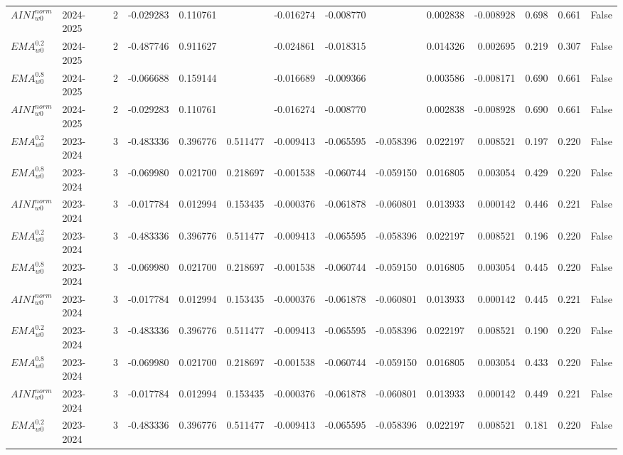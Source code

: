 \begin{tabular}{@{}llrrrrrrrrrlll@{}}
$AINI^{norm}_{w0}$ & 2024-2025 & 2 & -0.029283 & 0.110761 &  & -0.016274 & -0.008770 &  & 0.002838 & -0.008928 & 0.698 & 0.661 & False \\
$EMA^{0.2}_{w0}$ & 2024-2025 & 2 & -0.487746 & 0.911627 &  & -0.024861 & -0.018315 &  & 0.014326 & 0.002695 & 0.219 & 0.307 & False \\
$EMA^{0.8}_{w0}$ & 2024-2025 & 2 & -0.066688 & 0.159144 &  & -0.016689 & -0.009366 &  & 0.003586 & -0.008171 & 0.690 & 0.661 & False \\
$AINI^{norm}_{w0}$ & 2024-2025 & 2 & -0.029283 & 0.110761 &  & -0.016274 & -0.008770 &  & 0.002838 & -0.008928 & 0.690 & 0.661 & False \\
$EMA^{0.2}_{w0}$ & 2023-2024 & 3 & -0.483336 & 0.396776 & 0.511477 & -0.009413 & -0.065595 & -0.058396 & 0.022197 & 0.008521 & 0.197 & 0.220 & False \\
$EMA^{0.8}_{w0}$ & 2023-2024 & 3 & -0.069980 & 0.021700 & 0.218697 & -0.001538 & -0.060744 & -0.059150 & 0.016805 & 0.003054 & 0.429 & 0.220 & False \\
$AINI^{norm}_{w0}$ & 2023-2024 & 3 & -0.017784 & 0.012994 & 0.153435 & -0.000376 & -0.061878 & -0.060801 & 0.013933 & 0.000142 & 0.446 & 0.221 & False \\
$EMA^{0.2}_{w0}$ & 2023-2024 & 3 & -0.483336 & 0.396776 & 0.511477 & -0.009413 & -0.065595 & -0.058396 & 0.022197 & 0.008521 & 0.196 & 0.220 & False \\
$EMA^{0.8}_{w0}$ & 2023-2024 & 3 & -0.069980 & 0.021700 & 0.218697 & -0.001538 & -0.060744 & -0.059150 & 0.016805 & 0.003054 & 0.445 & 0.220 & False \\
$AINI^{norm}_{w0}$ & 2023-2024 & 3 & -0.017784 & 0.012994 & 0.153435 & -0.000376 & -0.061878 & -0.060801 & 0.013933 & 0.000142 & 0.445 & 0.221 & False \\
$EMA^{0.2}_{w0}$ & 2023-2024 & 3 & -0.483336 & 0.396776 & 0.511477 & -0.009413 & -0.065595 & -0.058396 & 0.022197 & 0.008521 & 0.190 & 0.220 & False \\
$EMA^{0.8}_{w0}$ & 2023-2024 & 3 & -0.069980 & 0.021700 & 0.218697 & -0.001538 & -0.060744 & -0.059150 & 0.016805 & 0.003054 & 0.433 & 0.220 & False \\
$AINI^{norm}_{w0}$ & 2023-2024 & 3 & -0.017784 & 0.012994 & 0.153435 & -0.000376 & -0.061878 & -0.060801 & 0.013933 & 0.000142 & 0.449 & 0.221 & False \\
$EMA^{0.2}_{w0}$ & 2023-2024 & 3 & -0.483336 & 0.396776 & 0.511477 & -0.009413 & -0.065595 & -0.058396 & 0.022197 & 0.008521 & 0.181 & 0.220 & False \\

\end{tabular}
